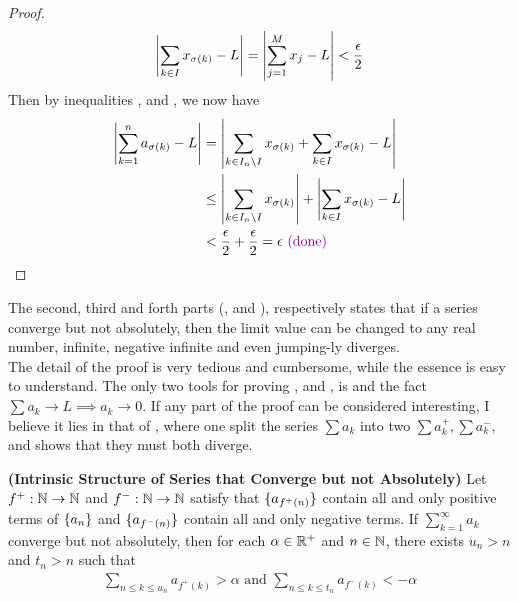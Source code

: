 \documentclass{report}
\begin{document}
\begin{proof}
\begin{align}
\label{e8}
\left|\sum_{k \in I}x_{\sigma(k)}- L\right|= \left|\sum_{j=1}^M x_j-L\right|< \frac{\epsilon}{2}
\end{align}
Then by inequalities ,  and , we now have 
\begin{align*}
\left|\sum_{k=1}^n a_{\sigma(k)}-L\right| &= \left|\sum_{k \in I_n \setminus I}x_{\sigma(k)} + \sum_{k \in I} x_{\sigma(k)}-L\right|\\
&\leq \left|\sum_{k \in I_n \setminus I}x_{\sigma(k)}\right|+\left|\sum_{k \in I} x_{\sigma(k)}-L\right| \\
&< \frac{\epsilon }{2}+\frac{\epsilon}{2}=\epsilon \textcolor{violet}{\text{ (done) }} 
\end{align*}
\end{proof}
\begin{mdframed}
The second, third and forth parts (,  and ), respectively states that if a series converge but not absolutely, then the limit value can be changed to any real number, infinite, negative infinite and even jumping-ly diverges.\\

The detail of the proof is very tedious and cumbersome, while the essence is easy to understand. The only two tools for proving ,  and , is  and the fact $\sum a_k\to L \implies a_k\to 0$. If any part of the proof can be considered interesting, I believe it lies in that of , where one split the series $\sum a_k$ into two $\sum a_k^+,\sum a_k^-$, and shows that they must both diverge. 
\end{mdframed}
\begin{lemma}
\label{l1}
\textbf{(Intrinsic Structure of Series that Converge but not Absolutely)} Let $f^+:\mathbb{N}\rightarrow \mathbb{N}$ and $f^-:\mathbb{N}\rightarrow \mathbb{N}$ satisfy that $\{ a_{f^+(n)} \}$ contain all and only positive terms of $\{ a_n \}$ and $\{ a_{f^-(n)} \}$ contain all and only negative terms. If $\sum_{k=1}^\infty a_k$ converge but not absolutely, then for each $\alpha \in\mathbb{R}^+$ and $n\in\mathbb{N}$, there exists  $u_n>n$ and $t_n>n$ such that 
\begin{align*}
\sum_{n\leq k\leq u_n} a_{f^+(k)}>\alpha \text{ and }\sum_{n\leq k\leq t_n}a_{f^-(k)}<-\alpha 
\end{align*}
\end{lemma}
\end{document}
